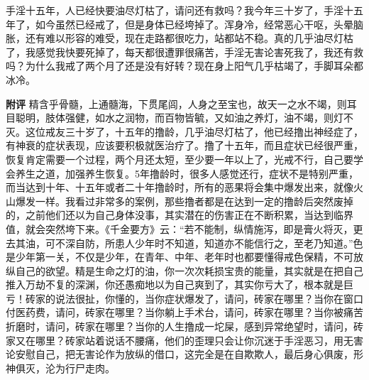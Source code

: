 \begin{case}
    手淫十五年，人已经快要油尽灯枯了，请问还有救吗？我今年三十岁了，手淫十五年了，如今虽然已经戒了，但是身体已经垮掉了。浑身冷，经常恶心干呕，头晕脑胀，还有难以形容的难受，现在走路都很吃力，站都站不稳。真的几乎油尽灯枯了，我感觉我快要死掉了，每天都很遭罪很痛苦，手淫无害论害死我了，我还有救吗？为什么我戒了两个月了还是没有好转？现在身上阳气几乎枯竭了，手脚耳朵都冰冷。

    \textbf{附评} 精含乎骨髓，上通髓海，下贯尾闾，人身之至宝也，故天一之水不竭，则耳目聪明，肢体强健，如水之润物，而百物皆毓，又如油之养灯，油不竭，则灯不灭。这位戒友三十岁了，十五年的撸龄，几乎油尽灯枯了，他已经撸出神经症了，有神衰的症状表现，应该要积极就医治疗了。撸了十五年，而且症状已经很严重，恢复肯定需要一个过程，两个月还太短，至少要一年以上了，光戒不行，自己要学会养生之道，加强养生恢复。5年撸龄时，很多人感觉还行，症状不是特别严重，而当达到十年、十五年或者二十年撸龄时，所有的恶果将会集中爆发出来，就像火山爆发一样。我看过非常多的案例，那些撸者都是在达到一定的撸龄后突然废掉的，之前他们还以为自己身体没事，其实潜在的伤害正在不断积累，当达到临界值，就会突然垮下来。《千金要方》云：“若不能制，纵情施泻，即是膏火将灭，更去其油，可不深自防，所患人少年时不知道，知道亦不能信行之，至老乃知道。”色是少年第一关，不仅是少年，在青年、中年、老年时也都要懂得戒色保精，不可放纵自己的欲望。精是生命之灯的油，你一次次耗损宝贵的能量，其实就是在把自己推入万劫不复的深渊，你还愚痴地以为自己爽到了，其实你亏大了，根本就是巨亏！砖家的说法很扯，你懂的，当你症状爆发了，请问，砖家在哪里？当你在窗口付医药费，请问，砖家在哪里？当你躺上手术台，请问，砖家在哪里？当你被痛苦折磨时，请问，砖家在哪里？当你的人生撸成一坨屎，感到异常绝望时，请问，砖家又在哪里？砖家站着说话不腰痛，他们的歪理只会让你沉迷于手淫恶习，用无害论安慰自己，把无害论作为放纵的借口，这完全是在自欺欺人，最后身心俱废，形神俱灭，沦为行尸走肉。
\end{case}

